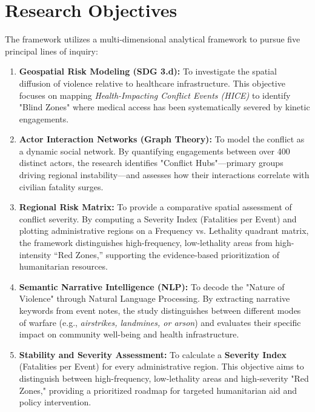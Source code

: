 \documentclass[conference]{IEEEtran}
\begin{document}
\section{Research Objectives}

The framework utilizes a multi-dimensional analytical framework to pursue five principal lines of inquiry:
\begin{enumerate} 
    \item \textbf{Geospatial Risk Modeling (SDG 3.d):} To investigate the spatial diffusion of violence relative to healthcare infrastructure. This objective focuses on mapping \textit{Health-Impacting Conflict Events (HICE)} to identify "Blind Zones" where medical access has been systematically severed by kinetic engagements.

    \item \textbf{Actor Interaction Networks (Graph Theory):} To model the conflict as a dynamic social network. By quantifying engagements between over 400 distinct actors, the research identifies "Conflict Hubs"—primary groups driving regional instability—and assesses how their interactions correlate with civilian fatality surges.

    \item \textbf{Regional Risk Matrix:} To provide a comparative spatial assessment of conflict severity. By computing a Severity Index (Fatalities per Event) and plotting administrative regions on a Frequency vs. Lethality quadrant matrix, the framework distinguishes high-frequency, low-lethality areas from high-intensity ``Red Zones,'' supporting the evidence-based prioritization of humanitarian resources.

    \item \textbf{Semantic Narrative Intelligence (NLP):} To decode the "Nature of Violence" through Natural Language Processing. By extracting narrative keywords from event notes, the study distinguishes between different modes of warfare (e.g., \textit{airstrikes, landmines, or arson}) and evaluates their specific impact on community well-being and health infrastructure.

    \item \textbf{Stability and Severity Assessment:} To calculate a \textbf{Severity Index} (Fatalities per Event) for every administrative region. This objective aims to distinguish between high-frequency, low-lethality areas and high-severity "Red Zones," providing a prioritized roadmap for targeted humanitarian aid and policy intervention.
\end{enumerate}
\end{document}
